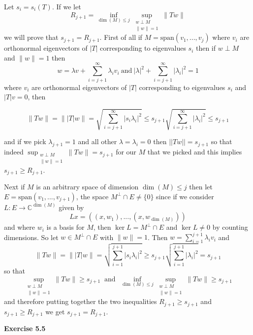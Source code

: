 \documentclass{article}
\begin{document}
\vspace{0.5cm}

\noindent Let $s_i = s_i(T)$. If we let
$$R_{j+1} = \inf\limits_{\dim(M) \leq j} \sup_{\substack{w \perp M \\ \|w\| = 1}} \|Tw\|$$
we will prove that $s_{j+1} = R_{j+1}$. First of all if $M = \text{span}(v_1,...,v_j)$ where $v_i$ are orthonormal eigenvectors of $|T|$ corresponding to eigenvalues $s_i$ then if $w \perp M$ and $\| w\| = 1$ then 
$$w = \lambda v + \sum\limits_{i =j+1}^\infty \lambda_i v_i \ \text{and} \ |\lambda|^2 +  \sum\limits_{i =j+1}^\infty |\lambda_i|^2 = 1$$ 
where $v_i$ are orthonormal eigenvectors of $|T|$ corresponding to eigenvalues $s_i$ and $|T|v = 0$, then

$$ \|Tw\| = \||T|w\| = \sqrt{\sum\limits_{i =j+1}^\infty |s_i\lambda_i|^2} \leq s_{j+1} \sqrt{\sum\limits_{i =j+1}^\infty |\lambda_i|^2} \leq s_{j+1}$$

and if we pick $\lambda_{j+1} = 1$ and all other $\lambda = \lambda_i = 0$ then $||Tw|| = s_{j+1}$ so that indeed $\sup_{\substack{w \perp M \\ \|w\| = 1}} \|Tw\| = s_{j+1}$ for our $M$ that we picked and this implies $s_{j+1} \geq R_{j+1}$.

Next if $M$ is an arbitrary space of dimension $\dim(M) \leq j$ then let $E = \text{span}(v_1,...,v_{j+1})$, the space $M^{\perp} \cap E \neq \{0\}$ since if we consider $L : E \rightarrow \mathbb C^{\dim(M)}$ given by 
$$Lx = ((x,w_1),...,(x,w_{\dim(M)}))$$ 
and where $w_i$ is a basis for $M$, then $\ker L = M^{\perp} \cap E$ and $\ker L \neq 0$ by counting dimensions. So let $w \in M^{\perp} \cap E$ with $\|w\| = 1$. Then $ w = \sum\limits_{i = 1}^{j+1} \lambda_i v_i $ and
$$\|Tw\| =\||T|w\| =  \sqrt{\sum\limits_{i = 1}^{j+1} |s_i\lambda_i|^2} \geq s_{j+1}\sqrt{\sum\limits_{i = 1}^{j+1} |\lambda_i|^2} = s_{j+1}$$
so that $$\sup_{\substack{w \perp M \\ \|w\| = 1}} \|Tw\| \geq s_{j+1} \ \text{  and } \ \inf\limits_{\dim(M) \leq j} \sup\limits_{\substack{w \perp M \\ \|w\| = 1}} \| Tw \| \geq s_{j+1}$$ and therefore putting together the two inequalities $R_{j+1} \geq s_{j+1}$ and $s_{j+1} \geq R_{j+1}$ we get $s_{j+1} = R_{j+1}$.

\vspace{0.5cm}

\textbf{Exercise 5.5}

\vspace{0.5cm}
\end{document}
